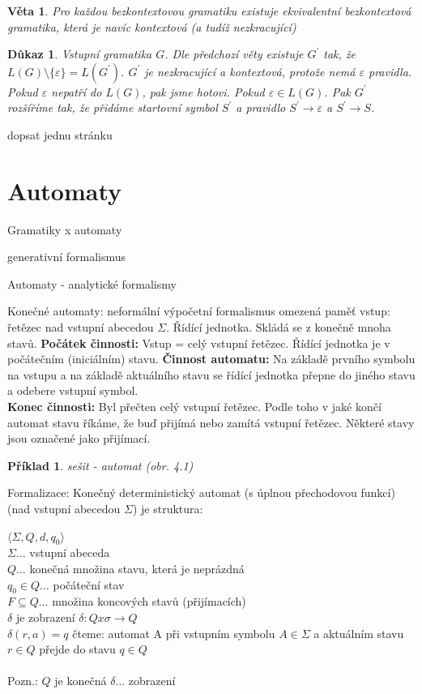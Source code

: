 \documentclass[10pt, a4paper, titlepage]{article}
\theoremstyle{note}
\newtheorem{veta}{\textbf{Věta}}
\newtheorem{dukaz}{\textbf{Důkaz}}
\newtheorem{priklad}{\textbf{Příklad}}
\begin{document}
\begin{veta}
Pro každou bezkontextovou gramatiku existuje ekvivalentní bezkontextová gramatika, která je navíc kontextová (a tudíž nezkracující)
\end{veta}

\begin{dukaz}
Vstupní gramatika $G$. Dle předchozí věty existuje $G^{'}$ tak, že $L(G) \setminus \lbrace \varepsilon \rbrace = L(G^{'})$. 
$G^{'}$ je nezkracující a kontextová, protože nemá $\varepsilon$ pravidla. Pokud $\varepsilon$ nepatří do $L(G)$, pak jsme hotovi.
Pokud $\varepsilon \in L(G)$. Pak $G^{'}$ rozšíříme tak, že přidáme startovní symbol $S^{'}$ 
a pravidlo $S^{'} \rightarrow \varepsilon$ a $S^{'} \rightarrow S$.
\end{dukaz}
dopsat jednu stránku

\section{Automaty}
Gramatiky x automaty

generativní formalismus

Automaty - analytické formalismy

Konečné automaty: neformální
výpočetní formalismus 
omezená paměť
vstup: řetězec nad vstupní abecedou $\Sigma.$ Řídící jednotka. Skládá se z konečně mnoha stavů.
\textbf{Počátek činnosti:} Vstup = celý vstupní řetězec. Řídící jednotka je v počátečním (iniciálním) stavu.
\textbf{Činnost automatu:} Na základě prvního symbolu na vstupu a na základě aktuálního stavu se řídící jednotka 
přepne do jiného stavu a odebere vstupní symbol.\\
\textbf{Konec činnosti:} Byl přečten celý vstupní řetězec. Podle toho v jaké končí automat stavu říkáme, 
že buď přijímá nebo zamítá vstupní řetězec. Některé stavy jsou označené jako přijímací.

\begin{priklad}
sešit - automat (obr. 4.1)
\end{priklad}

Formalizace:
Konečný deterministický automat (s úplnou přechodovou funkcí) (nad vstupní abecedou $\Sigma$) je struktura:

$\langle \Sigma, Q, d, q_{0} \rangle$ \\
$\Sigma \ldots$ vstupní abeceda \\
$Q \ldots$ konečná množina stavu, která je neprázdná \\
$q_{0} \in Q \ldots$ počáteční stav \\
$F \subseteq Q \ldots$ množina koncových stavů (přijímacích) \\
$\delta$ je zobrazení $\delta: Q x \sigma \rightarrow Q$ \\
$\delta(r,a) = q$ čteme: automat A při vstupním symbolu $A \in \Sigma$ a aktuálním stavu $r \in Q$
 přejde do stavu $q \in Q$
\\ \\
Pozn.: $Q$ je konečná
$\delta \ldots$ zobrazení
\end{document}
